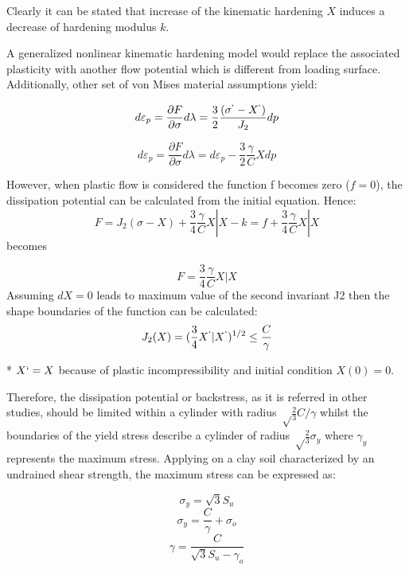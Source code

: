 \documentclass[12pt,a4paper]{report}
\begin{document}
Clearly it can be stated that increase of the kinematic hardening $X$ induces a decrease of hardening modulus $k$. 

A generalized nonlinear kinematic hardening model would replace the associated plasticity with another flow potential which is different from loading surface. Additionally, other set of von Mises material assumptions yield:

\begin{equation}
	d\varepsilon_p=\frac{\partial F}{\partial \sigma} d\lambda = \frac{3}{2} \frac{(\sigma^` - X^`)}{J_2} dp
\end{equation}

\begin{equation}
d\varepsilon_p=\frac{\partial F}{\partial \sigma} d\lambda = d\varepsilon_p - \frac{3}{2} \frac{\gamma}{C}X dp
\end{equation}

However, when plastic flow is considered the function f becomes zero ($f=0$), the dissipation potential can be calculated from the initial equation. Hence:
\begin{equation}
	F=J_2(\sigma - X)+ \frac{3}{4} \frac{\gamma}{C} X|X -k = f+\frac{3}{4} \frac{\gamma}{C}X|X
\end{equation}
becomes

\begin{equation}
	F=\frac{3}{4} \frac{\gamma}{C}X|X
\end{equation}
Assuming $dX=0$ leads to maximum value of the second invariant J2 then the shape boundaries of the function can be calculated:
\begin{equation}
	J_2(X)=(\frac{3}{4}X^`|X^`)^{1/2}\leq\frac{C}{\gamma}
\end{equation}

* $X`=X$ because of plastic incompressibility and initial condition $X(0)=0$.

Therefore, the dissipation potential or backstress, as it is referred in other studies, should be limited within a cylinder with radius $\sqrt\frac{2}{3} C/\gamma$ whilst the boundaries of the yield stress describe a cylinder of radius  $\sqrt\frac{2}{3}\sigma_y$ where $\gamma_y$ represents the maximum stress. Applying on a clay soil characterized by an undrained shear strength, the maximum stress can be expressed as:

\begin{equation}
\sigma_y=\sqrt{3}S_u
\end{equation}
\begin{equation}
\sigma_y = \frac{C}{\gamma}+\sigma_o
\end{equation}
\begin{equation}
\gamma = \frac{C}{\sqrt{3}S_u - \gamma_o}
\end{equation}
\end{document}
